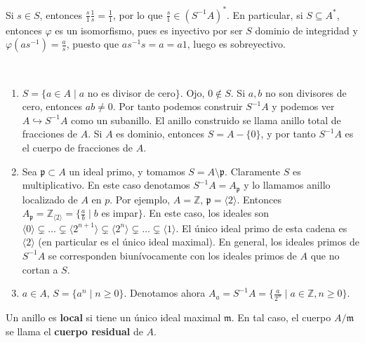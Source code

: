 \documentclass[ACGA.tex]{subfiles}
\begin{document}
\begin{observaciones}
Si $s\in S$, entonces $\frac{s}{1}\frac{1}{s}=\frac{1}{1}$, por lo que $\frac{s}{1}\in (S^{-1}A)^*$. En particular, si $S\subseteq A^*$, entonces $\varphi$ es un isomorfismo, pues es inyectivo por ser $S$ dominio de integridad y $\varphi(a s^{-1})=\frac{a}{s}$, puesto que $a s^{-1}s=a=a1$, luego es sobreyectivo.
\end{observaciones}

\begin{ej}\
\begin{enumerate}
\item $S=\{a\in A\mid a$ no es divisor de cero$\}$. Ojo, $0\notin S$. Si $a,b$ no son divisores de cero, entonces $ab\neq 0$. Por tanto podemos construir $S^{-1}A$ y podemos ver $A\hookrightarrow S^{-1}A$ como un subanillo. El anillo construido se llama anillo total de fracciones de $A$.  Si $A$ es dominio, entonces $S=A-\{0\}$, y por tanto $S^{-1}A$ es el cuerpo de fracciones de $A$.
\item Sea $\mathfrak{p}\subset A$ un ideal primo, y tomamos $S=A\setminus\mathfrak{p}$. Claramente $S$ es multiplicativo. En este caso denotamos $S^{-1}A=A_\mathfrak{p}$ y lo llamamos anillo localizado de $A$ en $p$. Por ejemplo, $A=\mathbb{Z}$, $\mathfrak{p}=\langle 2\rangle$. Entonces $A_\mathfrak{p}=\mathbb{Z}_{\langle 2\rangle}=\{\frac{a}{b}\mid b$ es impar$\}$. En este caso, los ideales son $\langle 0\rangle\subsetneq\dots\subsetneq\langle 2^{n+1}\rangle\subsetneq\langle 2^n\rangle\subsetneq\dots\subsetneq\langle 1\rangle$. El único ideal primo de esta cadena es $\langle 2\rangle$ (en particular es el único ideal maximal). En general, los ideales primos de $S^{-1}A$  se corresponden biunívocamente con los ideales primos de $A$ que no cortan a $S$. 
\item $a\in A$, $S=\{a^n\mid n\geq 0\}$. Denotamos ahora $A_a=S^{-1}A=\{\frac{a}{2^n}\mid a\in\mathbb{Z},n\geq 0\}$.
\end{enumerate}

\end{ej}

\begin{defi}
Un anillo es {\bf local } si tiene un único ideal maximal $\mathfrak{m}$. En tal caso, el cuerpo $A/\mathfrak{m}$ se llama el {\bf cuerpo residual } de $A$. 
\end{defi}
\end{document}
